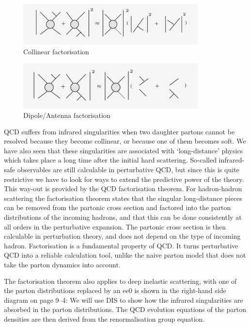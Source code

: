 \begin{figure}[h!]
\centering
\includegraphics[width=0.85\textwidth]{images/Intro/collinear.png}
\caption{Collinear factorisation}
\end{figure}

\begin{figure}[h!]
\centering
\includegraphics[width=0.85\textwidth]{images/Intro/factorization.png}
\caption{Dipole/Antenna factorisation}
\end{figure}

QCD suffers from infrared singularities
when two daughter partons cannot be resolved because they
become collinear, or because one of them becomes soft. We have also seen that these singularities are associated with ‘long-distance’ physics which takes place a long time after the initial hard scattering.
So-called infrared-safe observables are still calculable in perturbative QCD, but since this is quite restrictive we have to look for ways to extend the predictive power of the theory. This way-out is provided by the QCD factorisation theorem. For hadron-hadron scattering the factorisation theorem states that the singular long-distance pieces can be removed from the partonic
cross section and factored into the parton distributions of the incoming hadrons, and that this can be done consistently at all orders in the perturbative expansion.
The partonic cross section is then calculable in perturbation theory,
and does not depend on the type of incoming hadron. Factorisation is a fundamental property of QCD. It turns perturbative
QCD into a reliable calculation tool, unlike the naive parton
model that does not take the parton dynamics into account.

The factorisation theorem also applies to deep inelastic scattering,
with one of the parton distributions replaced by an ee0%
is shown in the right-hand side diagram on page 9–4:
We will use DIS to show how the infrared singularities are absorbed
in the parton distributions. The QCD evolution equations
of the parton densities are then derived from the renormalisation
group equation.
\newpage